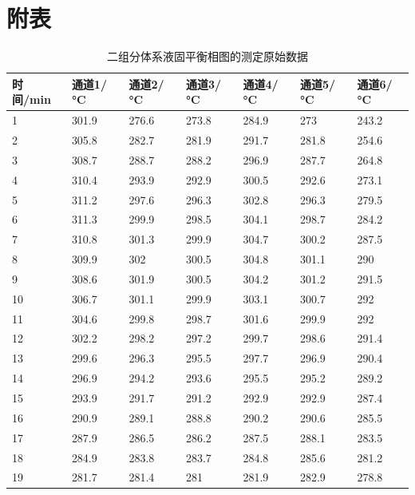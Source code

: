 \documentclass[12pt,hyperref,a4paper,UTF8]{ctexart}
\begin{document}
\section{附表}
\begin{table}[htp]
\centering
\caption{二组分体系液固平衡相图的测定原始数据}
\begin{tabular}{|l|l|l|l|l|l|l|}
\hline
时间/min & 通道1/°C & 通道2/°C & 通道3/°C & 通道4/°C & 通道5/°C & 通道6/°C \\ \hline
1      & 301.9  & 276.6  & 273.8  & 284.9  & 273    & 243.2  \\ \hline
2      & 305.8  & 282.7  & 281.9  & 291.7  & 281.8  & 254.6  \\ \hline
3      & 308.7  & 288.7  & 288.2  & 296.9  & 287.7  & 264.8  \\ \hline
4      & 310.4  & 293.9  & 292.9  & 300.5  & 292.6  & 273.1  \\ \hline
5      & 311.2  & 297.6  & 296.3  & 302.8  & 296.3  & 279.5  \\ \hline
6      & 311.3  & 299.9  & 298.5  & 304.1  & 298.7  & 284.2  \\ \hline
7      & 310.8  & 301.3  & 299.9  & 304.7  & 300.2  & 287.5  \\ \hline
8      & 309.9  & 302    & 300.5  & 304.8  & 301.1  & 290    \\ \hline
9      & 308.6  & 301.9  & 300.5  & 304.2  & 301.2  & 291.5  \\ \hline
10     & 306.7  & 301.1  & 299.9  & 303.1  & 300.7  & 292    \\ \hline
11     & 304.6  & 299.8  & 298.7  & 301.6  & 299.9  & 292    \\ \hline
12     & 302.2  & 298.2  & 297.2  & 299.7  & 298.6  & 291.4  \\ \hline
13     & 299.6  & 296.3  & 295.5  & 297.7  & 296.9  & 290.4  \\ \hline
14     & 296.9  & 294.2  & 293.6  & 295.5  & 295.2  & 289.2  \\ \hline
15     & 293.9  & 291.7  & 291.2  & 292.9  & 292.9  & 287.4  \\ \hline
16     & 290.9  & 289.1  & 288.8  & 290.2  & 290.6  & 285.5  \\ \hline
17     & 287.9  & 286.5  & 286.2  & 287.5  & 288.1  & 283.5  \\ \hline
18     & 284.9  & 283.8  & 283.7  & 284.8  & 285.6  & 281.2  \\ \hline
19     & 281.7  & 281.4  & 281    & 281.9  & 282.9  & 278.8  \\ \hline

\end{tabular}
\end{table}
\end{document}
